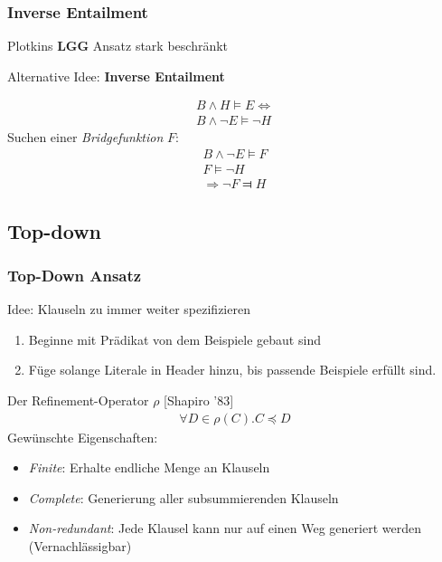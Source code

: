 \begin{frame}
	\frametitle{Inverse Entailment}
	Plotkins \textbf{LGG} Ansatz stark beschränkt

	Alternative Idee: \textbf{Inverse Entailment}

	\begin{align*}
		B \wedge H \vDash E \Leftrightarrow\\
		B \wedge \neg E \vDash \neg H
	\end{align*}
	Suchen einer \textit{Bridgefunktion} $F$:
	\begin{align*}
		B \wedge \neg E \vDash F\\
		F \vDash \neg H\\
		\Rightarrow \neg F \Dashv H
	\end{align*}
\end{frame}

\subsection{Top-down}
\begin{frame}[fragile]
\frametitle{Top-Down Ansatz}
Idee: Klauseln zu immer weiter spezifizieren

\begin{enumerate}
	\item Beginne mit Prädikat von dem Beispiele gebaut sind
	\item Füge solange Literale in Header hinzu, bis passende Beispiele erfüllt sind.
\end{enumerate}



	\begin{block}{Der Refinement-Operator $\rho$ [Shapiro '83]}
\begin{align*}
	\forall D \in \rho(C). C \preceq D
\end{align*}
	Gewünschte Eigenschaften:
	\begin{itemize}
		\item \textit{Finite}: Erhalte endliche Menge an Klauseln
		\item \textit{Complete}: Generierung aller subsummierenden Klauseln
		\item \textit{Non-redundant}: Jede Klausel kann nur auf einen Weg generiert werden
			(Vernachlässigbar)
	\end{itemize}
\end{block}
\end{frame}

